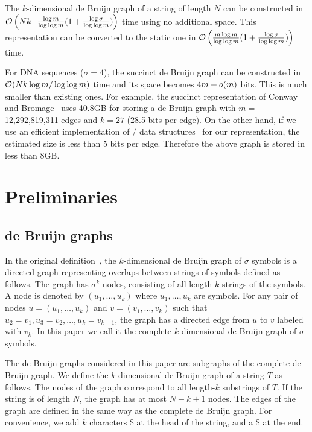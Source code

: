 \begin{theorem}
The $k$-dimensional de Bruijn graph of a string of length $N$
can be constructed in $\mathcal{O}\left(Nk \cdot \frac{\log m}{\log \log m}
(1+\frac{\log\sigma}{\log\log m})\right)$ time using no additional space.
This representation can be converted to the static one in 
$\mathcal{O}\left(\frac{m\log m}{\log \log m}
(1+\frac{\log\sigma}{\log\log m})\right)$ time.
\end{theorem}
For DNA sequences ($\sigma=4$), the succinct de Bruijn graph can be constructed in 
$\mathcal{O}(Nk \log m/\log\log m)$ time and its space becomes $4m + o(m)$ bits.
This is much smaller than existing ones.
For example, the succinct representation of Conway and Bromage~\cite{ConBro11}
uses 40.8GB for storing a de Bruijn graph with $m = $ 12,292,819,311 edges
and $k = 27$ (28.5 bits per edge).  
On the other hand, if we use an efficient implementation
of {\rank}/{\select} data structures~\cite{OkaSad07} for our representation,
the estimated size is less than $5$ bits per edge.  
Therefore the above graph is stored in less than 8GB.
\emergencystretch=20pt\par



\section{Preliminaries}\label{p1-sec:preliminaries}

\subsection{de Bruijn graphs}
In the original definition~\cite{deBruijn46}, the $k$-dimensional de Bruijn graph of $\sigma$ symbols
is a directed graph representing overlaps between strings of symbols defined as follows.
The graph has $\sigma^k$ nodes, consisting of all length-$k$ strings of the symbols.
A node is denoted by $(u_1,\ldots,u_k)$ where $u_1,\ldots,u_k$ are symbols.
For any pair of nodes $u = (u_1,\ldots,u_k)$ and $v = (v_1,\ldots,v_k)$ 
such that 
$u_2 = v_1, u_3 = v_2, \ldots, u_k = v_{k-1}$, the graph has a directed
edge from $u$ to $v$ labeled with $v_k$.
In this paper we call it the complete $k$-dimensional de Bruijn graph
of $\sigma$ symbols.

The de Bruijn graphs considered in this paper are subgraphs of the complete de Bruijn graph.
We define the $k$-dimensional de Bruijn graph of a string $T$ as follows.
The nodes of the graph correspond to all length-$k$ substrings of $T$.  If the string is of length $N$,
the graph has at most $N-k+1$ nodes.  The edges of the graph are defined in the same way as the complete
de Bruijn graph.  For convenience, we add $k$ characters \$ at the head of the string,
and a \$ at the end.

